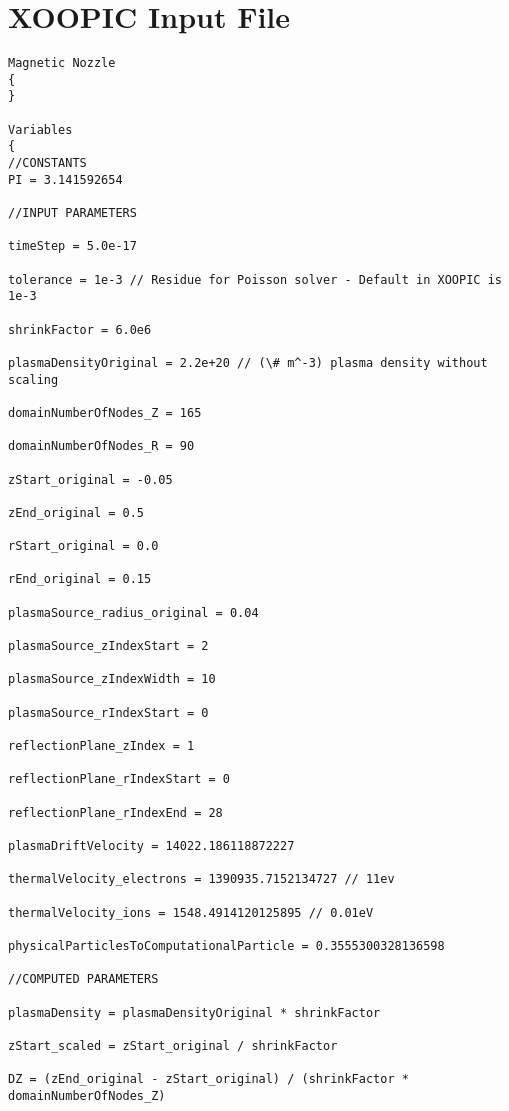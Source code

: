 \chapter{XOOPIC Input File} %

\label{AppendixA} %
\begin{verbatim}
Magnetic Nozzle
{
}

Variables
{
//CONSTANTS
PI = 3.141592654

//INPUT PARAMETERS

timeStep = 5.0e-17

tolerance = 1e-3 // Residue for Poisson solver - Default in XOOPIC is 1e-3

shrinkFactor = 6.0e6

plasmaDensityOriginal = 2.2e+20 // (\# m^-3) plasma density without scaling

domainNumberOfNodes_Z = 165

domainNumberOfNodes_R = 90

zStart_original = -0.05

zEnd_original = 0.5

rStart_original = 0.0

rEnd_original = 0.15

plasmaSource_radius_original = 0.04

plasmaSource_zIndexStart = 2

plasmaSource_zIndexWidth = 10

plasmaSource_rIndexStart = 0

reflectionPlane_zIndex = 1

reflectionPlane_rIndexStart = 0

reflectionPlane_rIndexEnd = 28

plasmaDriftVelocity = 14022.186118872227

thermalVelocity_electrons = 1390935.7152134727 // 11ev

thermalVelocity_ions = 1548.4914120125895 // 0.01eV

physicalParticlesToComputationalParticle = 0.3555300328136598

//COMPUTED PARAMETERS

plasmaDensity = plasmaDensityOriginal * shrinkFactor

zStart_scaled = zStart_original / shrinkFactor

DZ = (zEnd_original - zStart_original) / (shrinkFactor * domainNumberOfNodes_Z)


\end{verbatim}
